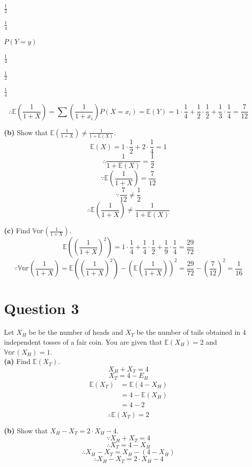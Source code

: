 \documentclass[
]{book}
\begin{document}
\(\frac{1}{2}\)

\(\frac{1}{4}\)

\(P(Y=y)\)

\(\frac{1}{4}\)

\(\frac{1}{2}\)

\(\frac{1}{4}\)

\[\therefore \mathbb{E}(\frac{1}{1+X}) = \sum (\frac{1}{1+x_i})P(X = x_i) = \mathbb{E}(Y) = 1 \cdot \frac{1}{4} + \frac{1}{2} \cdot \frac{1}{2} + \frac{1}{3} \cdot \frac{1}{4} = \frac{7}{12}\]

\textbf{(b)} Show that \(\mathbb{E}(\frac{1}{1+X}) \neq \frac{1}{1+\mathbb{E}(X)}\).\\
\[\mathbb{E}(X) = 1 \cdot \frac{1}{2} + 2 \cdot \frac{1}{4} = 1\]
\[\therefore \frac{1}{1+\mathbb{E}(X)} = \frac{1}{2}\]
\[\because \mathbb{E}(\frac{1}{1+X}) = \frac{7}{12}\]
\[\because \frac{7}{12} \neq \frac{1}{2}\]
\[\therefore \mathbb{E}(\frac{1}{1+X}) \neq \frac{1}{1+\mathbb{E}(X)}\]

\textbf{(c)} Find \(\mathbb{Var}(\frac{1}{1+X})\).\\
\[\mathbb{E}((\frac{1}{1+X})^2) = 1 \cdot \frac{1}{4} + \frac{1}{4} \cdot \frac{1}{2} + \frac{1}{9} \cdot \frac{1}{4} = \frac{29}{72}\]
\[\because \mathbb{Var}(\frac{1}{1+X}) = \mathbb{E}((\frac{1}{1+X})^2) - (\mathbb{E}(\frac{1}{1+X}))^2 = \frac{29}{72} - (\frac{7}{12})^2 = \frac{1}{16}\]

\section{Question 3}\label{question-3-3}

Let \(X_H\) be be the number of heads and \(X_T\) be the number of tails obtained in 4 independent tosses of a fair coin. You are given that \(\mathbb{E}(X_H) = 2\) and \(\mathbb{Var}(X_H) = 1\).\\
\textbf{(a)} Find \(\mathbb{E}(X_T)\).\\
\[X_H + X_T = 4\]
\[X_T = 4 - E_H\]
\[\begin{aligned}
\mathbb{E}(X_T) &= \mathbb{E}(4 - X_H) \\
                  &= 4 - \mathbb{E}(X_H) \\
                  &= 4 - 2 \\
\end{aligned}\]
\[\therefore \mathbb{E}(X_T) = 2\]

\textbf{(b)} Show that \(X_H - X_T = 2 \cdot X_H -4\).\\
\[\because X_H + X_T = 4\]
\[\therefore X_T = 4 - X_H\]
\[\therefore X_H - X_T = X_H - (4 - X_H)\]
\[\therefore X_H - X_T = 2 \cdot X_H - 4\]
\end{document}
